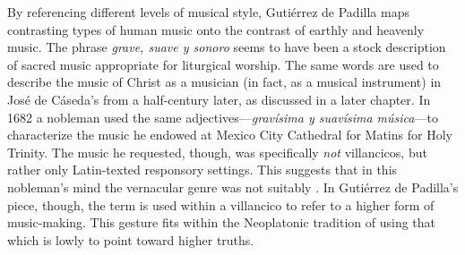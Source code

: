 By referencing different levels of musical style, Gutiérrez de Padilla maps
contrasting types of human music onto the contrast of earthly and heavenly
music.
The phrase \emph{grave, suave y sonoro} seems to have been a stock description
of sacred music appropriate for liturgical worship.%
    \Autocite
    [On \emph{suave} and other common vocabulary used for music in Spanish
    poetry of the period, see][]{UribeBracho:OrfeoPhD}
The same words are used to describe the music of Christ as a musician (in fact,
as a musical instrument) in José de Cáseda's  from a
half-century later, as discussed in a later chapter. %
In 1682 a nobleman used the same adjectives---\emph{gravísima y suavísima
música}---to characterize the music he endowed at Mexico City Cathedral for
Matins for Holy Trinity.%
    \Autocite[140--141]{Goldman:Responsory}
The music he requested, though, was specifically \emph{not} villancicos, but
rather only Latin-texted responsory settings.
This suggests that in this nobleman's mind the vernacular genre was not suitably
.
In Gutiérrez de Padilla's piece, though, the term is used within a villancico to
refer to a higher form of music-making. 
This gesture fits within the Neoplatonic tradition of using that which is lowly
to point toward higher truths.

